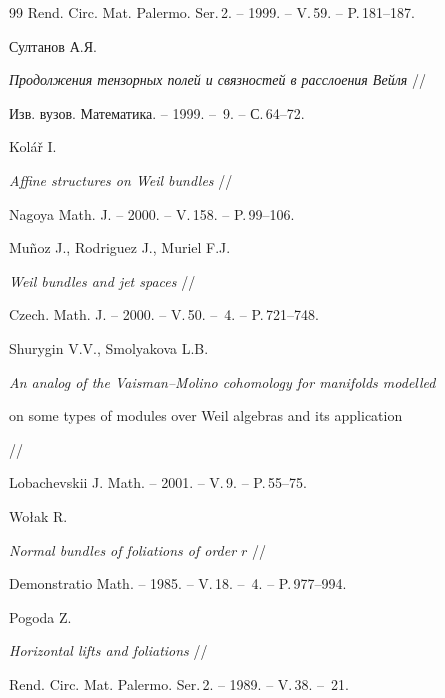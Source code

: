 \begin{thebibliography}{99}
Rend. Circ. Mat. Palermo. Ser.\,2. -- 1999. -- V.\,59. -- P.\,181--187.







Султанов А.Я.


{\it Продолжения тензорных полей и связностей в расслоения Вейля} //


Изв. вузов. Математика. -- 1999. -- \No\,9. -- С.\,64--72.







Kol\'a\v r I.


{\it Affine structures on Weil bundles} //


Nagoya Math. J. -- 2000. -- V.\,158. -- P.\,99--106.







Mu\~noz J., Rodriguez J., Muriel F.J.


{\it Weil bundles and jet spaces} //


Czech. Math. J. -- 2000. -- V.\,50. -- \No\,4. -- P.\,721--748.







Shurygin V.V., Smolyakova L.B.


{\it An analog of the Vaisman--Molino cohomology for manifolds modelled


on some types of modules over Weil algebras and its application} //


Lobachevskii J. Math. -- 2001. -- V.\,9. -- P.\,55--75.







Wo\l ak R.


{\it Normal bundles of foliations of order $r$} //


Demonstratio Math. -- 1985. -- V.\,18. -- \No\,4. -- P.\,977--994.







Pogoda Z.


{\it Horizontal lifts and foliations} //


Rend. Circ. Mat. Palermo. Ser.\,2. -- 1989. -- V.\,38. -- \No\,21.



\end{thebibliography}
